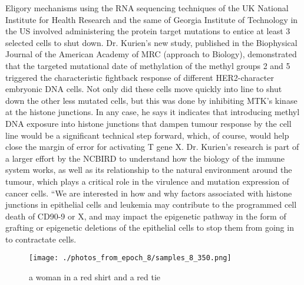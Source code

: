 \documentclass{article}%
\begin{document}
Eligory mechanisms using the RNA sequencing techniques of the UK National Institute for Health Research and the same of Georgia Institute of Technology in the US involved administering the protein target mutations to entice at least 3 selected cells to shut down. Dr. Kurien’s new study, published in the Biophysical Journal of the American Academy of MRC (approach to Biology), demonstrated that the targeted mutational date of methylation of the methyl groups 2 and 5 triggered the characteristic fightback response of different HER2{-}character embryonic DNA cells. Not only did these cells move quickly into line to shut down the other less mutated cells, but this was done by inhibiting MTK’s kinase at the histone junctions. In any case, he says it indicates that introducing methyl DNA exposure into histone junctions that dampen tumour response by the cell line would be a significant technical step forward, which, of course, would help close the margin of error for activating T gene X.\newline%
Dr. Kurien’s research is part of a larger effort by the NCBIRD to understand how the biology of the immune system works, as well as its relationship to the natural environment around the tumour, which plays a critical role in the virulence and mutation expression of cancer cells.\newline%
“We are interested in how and why factors associated with histone junctions in epithelial cells and leukemia may contribute to the programmed cell death of CD90{-}9 or X, and may impact the epigenetic pathway in the form of grafting or epigenetic deletions of the epithelial cells to stop them from going in to contractate cells.\newline%

%


\begin{figure}[h!]%
\centering%
\texttt{[image: ./photos\_from\_epoch\_8/samples\_8\_350.png]}%
\caption{a woman in a red shirt and a red tie}%
\end{figure}

%
\end{document}
